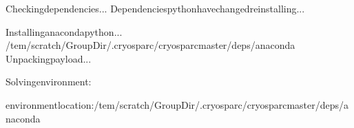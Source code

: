 \documentclass[a4paper,10pt,english]{sphinxmanual}
\begin{document}
\begin{sphinxVerbatim}[commandchars=\\\{\}]
Checkingdependencies...
Dependenciespythonhavechanged\PYGZhy{}reinstalling...
\PYGZhy{}\PYGZhy{}\PYGZhy{}\PYGZhy{}\PYGZhy{}\PYGZhy{}\PYGZhy{}\PYGZhy{}\PYGZhy{}\PYGZhy{}\PYGZhy{}\PYGZhy{}\PYGZhy{}\PYGZhy{}\PYGZhy{}\PYGZhy{}\PYGZhy{}\PYGZhy{}\PYGZhy{}\PYGZhy{}\PYGZhy{}\PYGZhy{}\PYGZhy{}\PYGZhy{}\PYGZhy{}\PYGZhy{}\PYGZhy{}\PYGZhy{}\PYGZhy{}\PYGZhy{}\PYGZhy{}\PYGZhy{}\PYGZhy{}\PYGZhy{}\PYGZhy{}\PYGZhy{}\PYGZhy{}\PYGZhy{}\PYGZhy{}\PYGZhy{}\PYGZhy{}\PYGZhy{}\PYGZhy{}\PYGZhy{}\PYGZhy{}\PYGZhy{}\PYGZhy{}\PYGZhy{}\PYGZhy{}\PYGZhy{}\PYGZhy{}\PYGZhy{}\PYGZhy{}\PYGZhy{}\PYGZhy{}\PYGZhy{}\PYGZhy{}\PYGZhy{}\PYGZhy{}\PYGZhy{}\PYGZhy{}\PYGZhy{}\PYGZhy{}\PYGZhy{}\PYGZhy{}\PYGZhy{}\PYGZhy{}\PYGZhy{}\PYGZhy{}\PYGZhy{}\PYGZhy{}\PYGZhy{}

Installinganacondapython...
\PYGZhy{}\PYGZhy{}\PYGZhy{}\PYGZhy{}\PYGZhy{}\PYGZhy{}\PYGZhy{}\PYGZhy{}\PYGZhy{}\PYGZhy{}\PYGZhy{}\PYGZhy{}\PYGZhy{}\PYGZhy{}\PYGZhy{}\PYGZhy{}\PYGZhy{}\PYGZhy{}\PYGZhy{}\PYGZhy{}\PYGZhy{}\PYGZhy{}\PYGZhy{}\PYGZhy{}\PYGZhy{}\PYGZhy{}\PYGZhy{}\PYGZhy{}\PYGZhy{}\PYGZhy{}\PYGZhy{}\PYGZhy{}\PYGZhy{}\PYGZhy{}\PYGZhy{}\PYGZhy{}\PYGZhy{}\PYGZhy{}\PYGZhy{}\PYGZhy{}\PYGZhy{}\PYGZhy{}\PYGZhy{}\PYGZhy{}\PYGZhy{}\PYGZhy{}\PYGZhy{}\PYGZhy{}\PYGZhy{}\PYGZhy{}\PYGZhy{}\PYGZhy{}\PYGZhy{}\PYGZhy{}\PYGZhy{}\PYGZhy{}\PYGZhy{}\PYGZhy{}\PYGZhy{}\PYGZhy{}\PYGZhy{}\PYGZhy{}\PYGZhy{}\PYGZhy{}\PYGZhy{}\PYGZhy{}\PYGZhy{}\PYGZhy{}\PYGZhy{}\PYGZhy{}\PYGZhy{}\PYGZhy{}
/tem/scratch/\PYGZlt{}GroupDir\PYGZgt{}/.cryosparc/cryosparc\PYGZus{}master/deps/anaconda
Unpackingpayload...

Solvingenvironment:


environmentlocation:/tem/scratch/\PYGZlt{}GroupDir\PYGZgt{}/.cryosparc/cryosparc\PYGZus{}master/deps/anaconda


\end{sphinxVerbatim}
\end{document}
